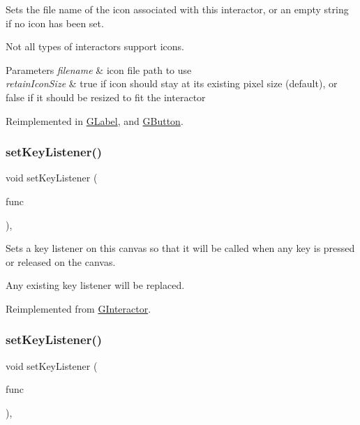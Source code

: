 Sets the file name of the icon associated with this interactor, or an empty string if no icon has been set. 

Not all types of interactors support icons. 
\begin{DoxyParams}{Parameters}
{\em filename} & icon file path to use \\
\hline
{\em retain\+Icon\+Size} & true if icon should stay at its existing pixel size (default), or false if it should be resized to fit the interactor \\
\hline
\end{DoxyParams}


Reimplemented in \mbox{\hyperlink{classGLabel_abbefcb1f611af273755c7e1cca921497}{G\+Label}}, and \mbox{\hyperlink{classGButton_abbefcb1f611af273755c7e1cca921497}{G\+Button}}.

\mbox{\label{classGCanvas_a53809ec015da5bf9fad5e7a11b218993}} 
\subsubsection{\texorpdfstring{set\+Key\+Listener()}{setKeyListener()}\hspace{0.1cm}{\footnotesize\ttfamily [1/2]}}
{\footnotesize\ttfamily void set\+Key\+Listener (\begin{DoxyParamCaption}\item[{G\+Event\+Listener}]{func }\end{DoxyParamCaption})\hspace{0.3cm}{\ttfamily [override]}, {\ttfamily [virtual]}}



Sets a key listener on this canvas so that it will be called when any key is pressed or released on the canvas. 

Any existing key listener will be replaced. 

Reimplemented from \mbox{\hyperlink{classGInteractor_aeb8324d3287fa1fbe093f4d6230cf0a6}{G\+Interactor}}.

\mbox{\label{classGCanvas_a1320ed9889a730dfead04a334463ecf3}} 
\subsubsection{\texorpdfstring{set\+Key\+Listener()}{setKeyListener()}\hspace{0.1cm}{\footnotesize\ttfamily [2/2]}}
{\footnotesize\ttfamily void set\+Key\+Listener (\begin{DoxyParamCaption}\item[{G\+Event\+Listener\+Void}]{func }\end{DoxyParamCaption})\hspace{0.3cm}{\ttfamily [override]}, {\ttfamily [virtual]}}



